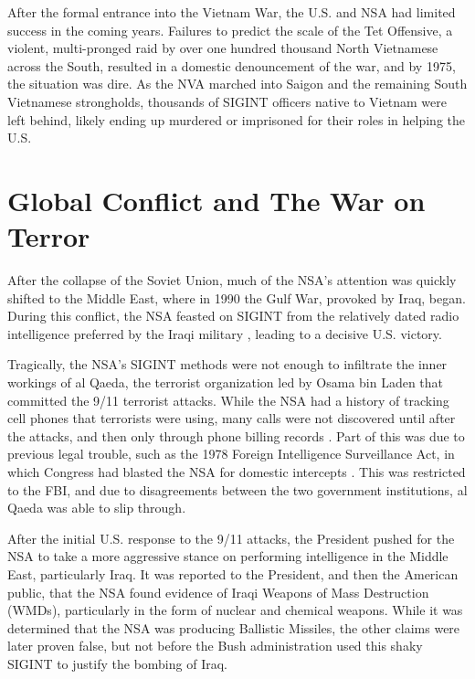 \documentclass[12pt]{article}
\begin{document}
After the formal entrance into the Vietnam War, the U.S. and NSA had limited success in the coming years. Failures to predict the scale of the Tet Offensive, a violent, multi-pronged raid by over one hundred thousand North Vietnamese across the South, resulted in a domestic denouncement of the war, and by 1975, the situation was dire\cite{secret_sentry}. As the NVA marched into Saigon and the remaining South Vietnamese strongholds, thousands of SIGINT officers native to Vietnam were left behind, likely ending up murdered or imprisoned for their roles in helping the U.S\cite{signal_corp}.

\section{Global Conflict and The War on Terror}

After the collapse of the Soviet Union, much of the NSA's attention was quickly shifted to the Middle East, where in 1990 the Gulf War, provoked by Iraq, began. During this conflict, the NSA feasted on SIGINT from the relatively dated radio intelligence preferred by the Iraqi military \cite{secret_sentry}, leading to a decisive U.S. victory. 

Tragically, the NSA's SIGINT methods were not enough to infiltrate the inner workings of al Qaeda, the terrorist organization led by Osama bin Laden that committed the 9/11 terrorist attacks. While the NSA had a history of tracking cell phones that terrorists were using, many calls were not discovered until after the attacks, and then only through phone billing records \cite{Select_Committee_on_Intelligence_2002}. Part of this was due to previous legal trouble, such as the 1978 Foreign Intelligence Surveillance Act, in which Congress had blasted the NSA for domestic intercepts \cite{justicedept}. This was restricted to the FBI, and due to disagreements between the two government institutions, al Qaeda was able to slip through. 

After the initial U.S. response to the 9/11 attacks, the President pushed for the NSA to take a more aggressive stance on performing intelligence in the Middle East, particularly Iraq\cite{secret_sentry}. It was reported to the President, and then the American public, that the NSA found evidence of Iraqi Weapons of Mass Destruction (WMDs), particularly in the form of nuclear and chemical weapons\cite{Richelson_2003}. While it was determined that the NSA was producing Ballistic Missiles, the other claims were later proven false, but not before the Bush administration used this shaky SIGINT to justify the bombing of Iraq. 
\end{document}
